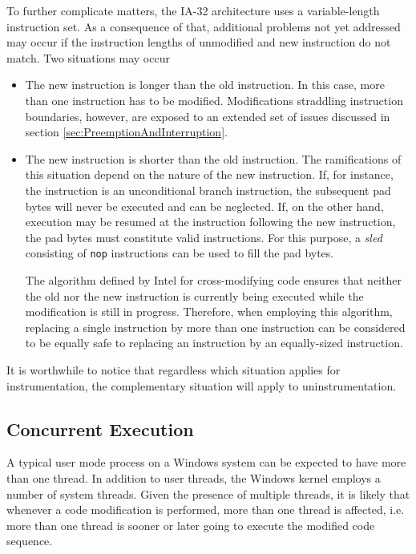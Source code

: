 To further complicate matters, the IA-32 architecture uses a variable-length instruction set. 
As a consequence of that, additional problems not yet addressed may occur if the instruction lengths of unmodified 
and new instruction do not match. Two situations may occur
\begin{itemize} 
	\item The new instruction is longer than the old instruction. In this case, more than one
			  instruction has to be modified. Modifications straddling instruction boundaries, however,
			  are exposed to an extended set of issues discussed in section \ref{sec:PreemptionAndInterruption}.
	\item The new instruction is shorter than the old instruction. The ramifications of this situation
			  depend on the nature of the new instruction. If, for instance, the instruction is an
			  unconditional branch instruction, the subsequent pad bytes will never be executed and can be neglected. If, 
			  on the other hand, execution may be resumed at the instruction following the new instruction,
			  the pad bytes must constitute valid instructions. For this purpose, a \emph{sled} consisting of
			  \verb|nop| instructions can be used to fill the pad bytes.
			  
			  The algorithm defined by Intel for cross-modifying code ensures that 
			  neither the old nor the new instruction is 
			  currently being executed while the modification is still in progress. Therefore, when employing
			  this algorithm, replacing a single instruction by more than one instruction can 
			  be considered to be equally safe to replacing an instruction by an equally-sized instruction.
\end{itemize}			  

It is worthwhile to notice that regardless which situation applies for instrumentation, the
complementary situation will apply to uninstrumentation.
			  
\subsection{Concurrent Execution}
\label{sec:ConcurrentExecution}
A typical user mode process on a Windows system can be expected to have more than 
one thread. In addition to user threads, the Windows kernel employs a number of 
system threads. Given the presence of multiple threads, it is likely that whenever 
a code modification is performed, more than one thread is affected, 
i.e. more than one thread is sooner or later going to execute the modified
code sequence. 

